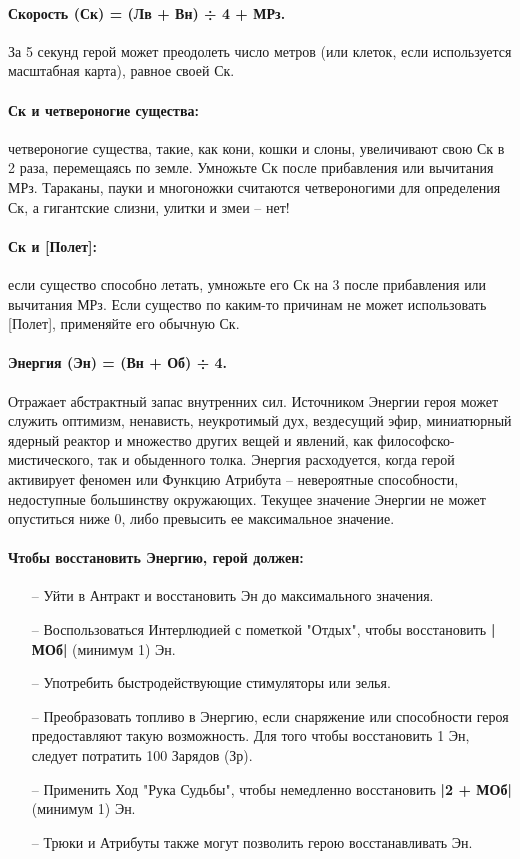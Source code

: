 \paragraph{Скорость (Ск) = (Лв + Вн) ÷ 4 + МРз.} За 5 секунд герой может преодолеть число метров (или клеток, если используется масштабная карта), равное своей Ск.
\paragraph{Ск и четвероногие существа:} четвероногие существа, такие, как кони, кошки и слоны, увеличивают свою Ск в 2 раза, перемещаясь по земле. Умножьте Ск после прибавления или вычитания МРз. Тараканы, пауки и многоножки считаются четвероногими для определения Ск, а гигантские слизни, улитки и змеи – нет!
\paragraph{Ск и [Полет]:} если существо способно летать, умножьте его Ск на 3 после прибавления или вычитания МРз. Если существо по каким-то причинам не может использовать [Полет], применяйте его обычную Ск.

\paragraph{Энергия (Эн) = (Вн + Об) ÷ 4.} Отражает абстрактный запас внутренних сил. Источником Энергии героя может служить оптимизм, ненависть, неукротимый дух, вездесущий эфир, миниатюрный ядерный реактор и множество других вещей и явлений, как философско-мистического, так и обыденного толка.
\newline Энергия расходуется, когда герой активирует феномен или Функцию Атрибута – невероятные способности, недоступные большинству окружающих. Текущее значение Энергии не может опуститься ниже 0, либо превысить ее максимальное значение.

\paragraph{Чтобы восстановить Энергию, герой должен:}
\begin{itemize}
    \item[--] Уйти в Антракт и восстановить Эн до максимального значения.
    \item[--] Воспользоваться Интерлюдией с пометкой "Отдых", чтобы восстановить \textbf{|МОб|} (минимум 1) Эн.
    \item[--] Употребить быстродействующие стимуляторы или зелья.
    \item[--] Преобразовать топливо в Энергию, если снаряжение или способности героя предоставляют такую возможность. Для того чтобы восстановить 1 Эн, следует потратить 100 Зарядов (Зр).
    \item[--] Применить Ход "Рука Судьбы", чтобы немедленно восстановить \textbf{|2 + МОб|} (минимум 1) Эн.
    \item[--] Трюки и Атрибуты также могут позволить герою восстанавливать Эн. 
\end{itemize}

